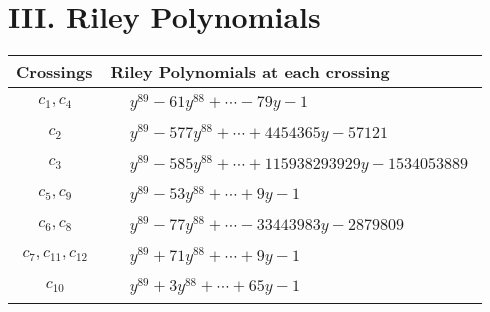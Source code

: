 \documentclass[1p]{elsarticle_modified}
\theoremstyle{definition}
\begin{document}
\centering \section*{ III. Riley Polynomials}
\begin{tabular}{m{50pt}|m{274pt}}
Crossings & \hspace{64pt}Riley Polynomials at each crossing \\
\hline $$\begin{aligned}c_{1},c_{4}\end{aligned}$$&$\begin{aligned}
&y^{89}-61 y^{88}+\cdots-79 y-1
\end{aligned}$\\
\hline $$\begin{aligned}c_{2}\end{aligned}$$&$\begin{aligned}
&y^{89}-577 y^{88}+\cdots+4454365 y-57121
\end{aligned}$\\
\hline $$\begin{aligned}c_{3}\end{aligned}$$&$\begin{aligned}
&y^{89}-585 y^{88}+\cdots+115938293929 y-1534053889
\end{aligned}$\\
\hline $$\begin{aligned}c_{5},c_{9}\end{aligned}$$&$\begin{aligned}
&y^{89}-53 y^{88}+\cdots+9 y-1
\end{aligned}$\\
\hline $$\begin{aligned}c_{6},c_{8}\end{aligned}$$&$\begin{aligned}
&y^{89}-77 y^{88}+\cdots-33443983 y-2879809
\end{aligned}$\\
\hline $$\begin{aligned}c_{7},c_{11},c_{12}\end{aligned}$$&$\begin{aligned}
&y^{89}+71 y^{88}+\cdots+9 y-1
\end{aligned}$\\
\hline $$\begin{aligned}c_{10}\end{aligned}$$&$\begin{aligned}
&y^{89}+3 y^{88}+\cdots+65 y-1
\end{aligned}$\\
\hline
\end{tabular}
\vskip 2pc
\end{document}
